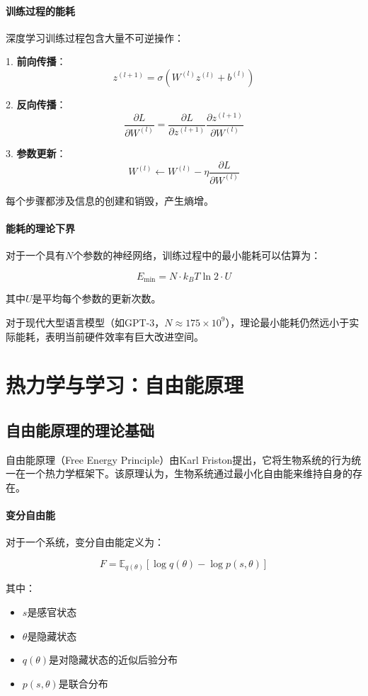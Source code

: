 \paragraph{训练过程的能耗}
深度学习训练过程包含大量不可逆操作：

1. \textbf{前向传播}：
   $$z^{(l+1)} = \sigma(W^{(l)} z^{(l)} + b^{(l)})$$
   
2. \textbf{反向传播}：
   $$\frac{\partial L}{\partial W^{(l)}} = \frac{\partial L}{\partial z^{(l+1)}} \frac{\partial z^{(l+1)}}{\partial W^{(l)}}$$
   
3. \textbf{参数更新}：
   $$W^{(l)} \leftarrow W^{(l)} - \eta \frac{\partial L}{\partial W^{(l)}}$$

每个步骤都涉及信息的创建和销毁，产生熵增。

\paragraph{能耗的理论下界}
对于一个具有$N$个参数的神经网络，训练过程中的最小能耗可以估算为：

$$E_{\min} = N \cdot k_B T \ln 2 \cdot U$$

其中$U$是平均每个参数的更新次数。

对于现代大型语言模型（如GPT-3，$N \approx 175 \times 10^9$），理论最小能耗仍然远小于实际能耗，表明当前硬件效率有巨大改进空间。

\section{热力学与学习：自由能原理}

\subsection{自由能原理的理论基础}

自由能原理（Free Energy Principle）由Karl Friston提出，它将生物系统的行为统一在一个热力学框架下。该原理认为，生物系统通过最小化自由能来维持自身的存在。

\paragraph{变分自由能}
对于一个系统，变分自由能定义为：

$$F = \mathbb{E}_{q(\theta)}[\log q(\theta) - \log p(s,\theta)]$$

其中：
\begin{itemize}
\item $s$是感官状态
\item $\theta$是隐藏状态
\item $q(\theta)$是对隐藏状态的近似后验分布
\item $p(s,\theta)$是联合分布
\end{itemize}


